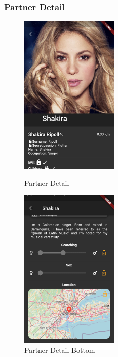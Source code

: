 \documentclass{article}
\begin{document}
\clearpage


\subsubsection{Partner Detail}
\begin{figure}[!htb]
	\centering
	\begin{minipage}{.45\textwidth}
		\centering
		\includegraphics[height=7.7cm,keepaspectratio]{assets/images/ui/partner-detail/14-partner-detail-screen.png}
		\caption{Partner Detail}
	\end{minipage}\quad
	\begin{minipage}{.45\textwidth}
		\centering
		\includegraphics[height=7.7cm,keepaspectratio]{assets/images/ui/partner-detail/15-partner-detail-screen-2.png}
		\caption{Partner Detail Bottom}
	\end{minipage}
\end{figure}

\clearpage
\end{document}
